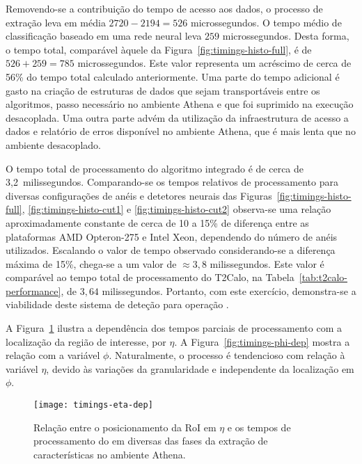 Removendo-se a contribuição do tempo de acesso aos dados, o processo de
extração leva em média $2720-2194=526$ microssegundos. O tempo médio de
classificação baseado em uma rede neural leva $259$ microssegundos. Desta
forma, o tempo total, comparável àquele da
Figura~\ref{fig:timings-histo-full}, é de $526+259=785$ microssegundos. Este
valor representa um acréscimo de cerca de 56\% do tempo total calculado
anteriormente. Uma parte do tempo adicional é gasto na criação de estruturas
de dados que sejam transportáveis entre os algoritmos, passo necessário no
ambiente Athena e que foi suprimido na execução desacoplada. Uma outra parte
advém da utilização da infraestrutura de acesso a dados e relatório de erros
disponível no ambiente Athena, que é mais lenta que no ambiente desacoplado.

O tempo total de processamento do algoritmo integrado é de cerca de
3,2~milissegundos. Comparando-se os tempos relativos de processamento para
diversas configurações de anéis e detetores neurais das
Figuras~\ref{fig:timings-histo-full}, \ref{fig:timings-histo-cut1} e
\ref{fig:timings-histo-cut2} observa-se uma relação aproximadamente constante
de cerca de 10 a 15\% de diferença entre as plataformas AMD Opteron-275 e
Intel Xeon, dependendo do número de anéis utilizados. Escalando o valor de
tempo observado considerando-se a diferença máxima de 15\%, chega-se a um
valor de $\approx 3,8$ milissegundos. Este valor é comparável ao tempo total
de processamento do T2Calo, na Tabela~\ref{tab:t2calo-performance}, de $3,64$
milissegundos. Portanto, com este exercício, demonstra-se a viabilidade deste
sistema de deteção para operação .

A Figura~\ref{fig:timings-eta-dep} ilustra a dependência dos tempos parciais
de processamento com a localização da região de interesse, por $\eta$. A
Figura~\ref{fig:timings-phi-dep} mostra a relação com a variável
$\phi$. Naturalmente, o processo é tendencioso com relação à variável $\eta$,
devido às variações da granularidade e independente da localização em $\phi$.

\begin{figure}
\begin{center}
\texttt{[image: timings-eta-dep]}
\end{center}
\caption{Relação entre o posicionamento da RoI em $\eta$ e os tempos de
processamento do  em diversas das fases da extração de
características no ambiente Athena.}
\label{fig:timings-eta-dep}
\end{figure}

